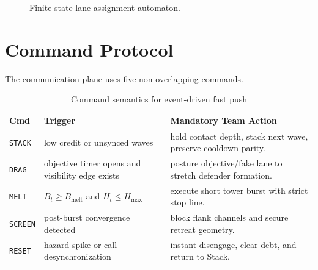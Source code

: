 \documentclass[runningheads]{llncs}
\begin{document}
\begin{figure}[t]
\centering
{}
\caption{Finite-state lane-assignment automaton.}
\label{fig:hok-fsa-en}
\end{figure}

\section{Command Protocol}
The communication plane uses five non-overlapping commands.
\begin{table}[t]
\centering
\caption{Command semantics for event-driven fast push}
\begin{tabular}{p{1.7cm}p{3.1cm}p{5.6cm}}
\toprule
Cmd & Trigger & Mandatory Team Action \\
\midrule
\texttt{STACK} & low credit or unsynced waves & hold contact depth, stack next wave, preserve cooldown parity. \\
\texttt{DRAG} & objective timer opens and visibility edge exists & posture objective/fake lane to stretch defender formation. \\
\texttt{MELT} & $B_t\!\ge\!B_{\text{melt}}$ and $H_t\!\le\!H_{\max}$ & execute short tower burst with strict stop line. \\
\texttt{SCREEN} & post-burst convergence detected & block flank channels and secure retreat geometry. \\
\texttt{RESET} & hazard spike or call desynchronization & instant disengage, clear debt, and return to Stack. \\
\bottomrule
\end{tabular}
\end{table}
\end{document}
